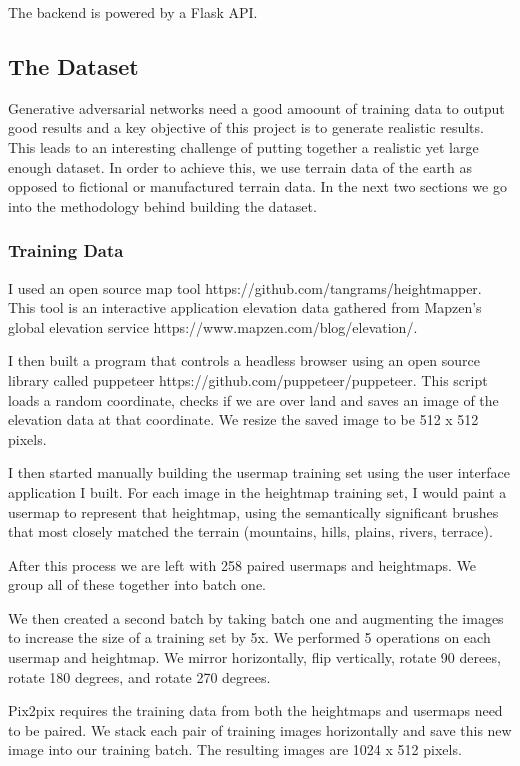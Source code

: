 \documentclass[twocolumn]{article}
\begin{document}
	The backend is powered by a Flask API.
	
	\subsection{The Dataset}
	
	Generative adversarial networks need a good amoount of training data to output good results and a key objective of this project is to generate realistic results. This leads to an interesting challenge of putting together a realistic yet large enough dataset. In order to achieve this, we use terrain data of the earth as opposed to fictional or manufactured terrain data. In the next two sections we go into the methodology behind building the dataset.

	\subsubsection{Training Data}
	
	I used an open source map tool https://github.com/tangrams/heightmapper. This tool is an interactive application elevation data gathered from Mapzen's global elevation service https://www.mapzen.com/blog/elevation/.
	
	I then built a program that controls a headless browser using an open source library called puppeteer https://github.com/puppeteer/puppeteer. This script loads a random coordinate, checks if we are over land and saves an image of the elevation data at that coordinate. We resize the saved image to be 512 x 512 pixels.
	
	I then started manually building the usermap training set using the user interface application I built. For each image in the heightmap training set, I would paint a usermap to represent that heightmap, using the semantically significant brushes that most closely matched the terrain (mountains, hills, plains, rivers, terrace).

	After this process we are left with 258 paired usermaps and heightmaps. We group all of these together into batch one.
	
	We then created a second batch by taking batch one and augmenting the images to increase the size of a training set by 5x. We performed 5 operations on each usermap and heightmap. We mirror horizontally, flip vertically, rotate 90 derees, rotate 180 degrees, and rotate 270 degrees.	
	
	Pix2pix requires the training data from both the heightmaps and usermaps need to be paired. We stack each pair of training images horizontally and save this new image into our training batch. The resulting images are 1024 x 512 pixels.
		
\end{document}
